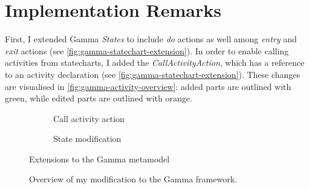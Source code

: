 \section{Implementation Remarks}\label{sec:implementation-remarks}

First, I extended Gamma \emph{States} to include \emph{do} actions as well among \emph{entry} and \emph{exit} actions (see \autoref{fig:gamma-statechart-extension}). In order to enable calling activities from statecharts, I added the \emph{CallActivityAction}, which has a reference to an activity declaration (see \autoref{fig:gamma-statechart-extension}). These changes are visualised in \autoref{fig:gamma-activity-overview}: added parts are outlined with green, while edited parts are outlined with orange.

\begin{figure}[!ht]
	\begin{subfigure}{.66\textwidth}
		\centering
		
		\caption{Call activity action}
		\label{fig:gamma-activity-extension}
	\end{subfigure}%
	\begin{subfigure}{.33\textwidth}
		\centering
		
		\caption{State modification}
		\label{fig:gamma-statechart-extension}
	\end{subfigure}
	\caption{Extensions to the Gamma metamodel}
	\label{fig:gamma-extension}
\end{figure}

\begin{figure}[!ht]
	\centering
	
	\caption{Overview of my modification to the Gamma framework.}
	\label{fig:gamma-activity-overview}
\end{figure}

